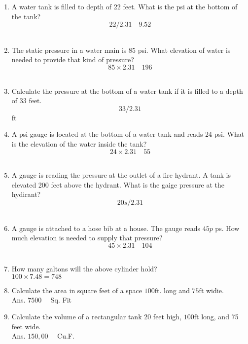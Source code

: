 \begin{enumerate}
\item A water tank is filled to depth of 22 feet. What is the psi at the bottom of the tank?\\
$$22 / 2.31 \quad 9.52$$\\

\item The static pressure in a water main is 85 psi. What elevation of water is needed to provide that kind of pressure?\\
$$85 \times 2.31 \quad 196$$\\

\item Calculate the pressure at the bottom of a water tank if it is filled to a depth of 33 feet.\\
$$33 / 2.31$$ft\\

\item A psi gauge is located at the bottom of a water tank and reads 24 psi. What is the elevation of the water inside the tank?\\
$$24 \times 2.31 \quad 55$$\\

\item A gauge is reading the pressure at the outlet of a fire hydrant. A tank is elevated 200 feet above the hydrant. What is the gaige pressure at the hydirant?\\
$$20 s / 2.31$$\\

\item A gauge is attached to a hose bib at a house. The gauge reads $45 p$ ps. How much elevation is needed to supply that pressure?\\
$$45 \times 2.31 \quad 104$$\\

\item How many galtons will the above cylinder hold?\\
$100 \times 7.48=748$\\

\item Calculate the area in square feet of a space $100 \mathrm{ft}$. long and $75 \mathrm{ft}$ widie.\\
Ans. $7500 \quad$ Sq. Fit\\

\item Calculate the volume of a rectangular tank 20 feet high, $100 \mathrm{ft}$ long, and 75 feet wide.\\
Ans. $150,00 \quad$ Cu.F.\\


\end{enumerate}

